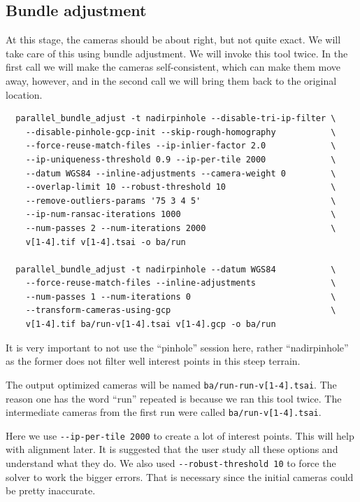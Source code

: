 \subsection{Bundle adjustment}

At this stage, the cameras should be about right, but not quite
exact. We will take care of this using bundle adjustment. 
We will invoke this tool twice. In the first call we will make the
cameras self-consistent, which can make them move away, however,
and in the second call we will bring them back to the original location.

\begin{verbatim}
  parallel_bundle_adjust -t nadirpinhole --disable-tri-ip-filter \
    --disable-pinhole-gcp-init --skip-rough-homography           \
    --force-reuse-match-files --ip-inlier-factor 2.0             \
    --ip-uniqueness-threshold 0.9 --ip-per-tile 2000             \
    --datum WGS84 --inline-adjustments --camera-weight 0         \
    --overlap-limit 10 --robust-threshold 10                     \
    --remove-outliers-params '75 3 4 5'                          \
    --ip-num-ransac-iterations 1000                              \
    --num-passes 2 --num-iterations 2000                         \
    v[1-4].tif v[1-4].tsai -o ba/run

  parallel_bundle_adjust -t nadirpinhole --datum WGS84           \
    --force-reuse-match-files --inline-adjustments               \
    --num-passes 1 --num-iterations 0                            \
    --transform-cameras-using-gcp                                \
    v[1-4].tif ba/run-v[1-4].tsai v[1-4].gcp -o ba/run
\end{verbatim}

It is very important to not use the ``pinhole'' session here, rather
``nadirpinhole'' as the former does not filter well interest points
in this steep terrain.

The output optimized cameras will be named \texttt{ba/run-run-v[1-4].tsai}.
The reason one has the word ``run'' repeated is because we ran 
this tool twice. The intermediate cameras from the first run 
were called \texttt{ba/run-v[1-4].tsai}.

Here we use \texttt{-\/-ip-per-tile 2000} to create a lot of interest
points. This will help with alignment later. It is suggested that the
user study all these options and understand what they do. 
We also used \texttt{-\/-robust-threshold 10}
to force the solver to work the bigger errors. That is necessary
since the initial cameras could be pretty inaccurate. 

